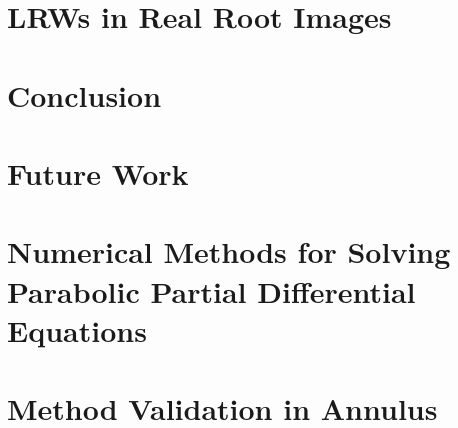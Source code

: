 \documentclass{uofsthesis-cs}
\begin{document}
  

  



  
  
\chapter{LRWs in Real Root Images}

 

\chapter{Conclusion}
  


  
\chapter{Future Work}

 







  \uofsappendix %

  \begin{appendices}

    \chapter{Numerical Methods for Solving Parabolic Partial Differential Equations}
      

    \chapter{Method Validation in Annulus}
      
    
  \end{appendices}
  
  



\end{document}

